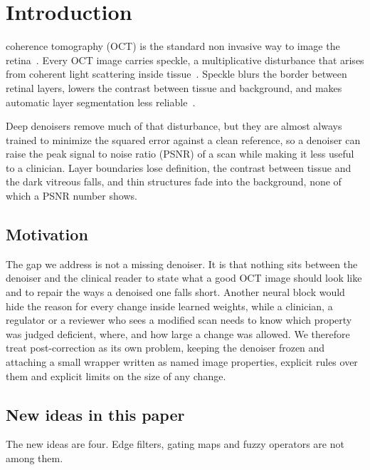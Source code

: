 \section{Introduction}
\label{sec:introduction}
 coherence tomography (OCT) is the standard non invasive way to image the
retina~\cite{huang1991optical}. Every OCT image carries speckle, a multiplicative disturbance that
arises from coherent light scattering inside tissue~\cite{goodman2007speckle}. Speckle blurs the
border between retinal layers, lowers the contrast between tissue and background, and makes
automatic layer segmentation less reliable~\cite{devalla2018drunet}.

Deep denoisers remove much of that disturbance, but they are almost always trained to minimize the
squared error against a clean reference, so a denoiser can raise the peak signal to noise ratio (PSNR)
of a scan while making it less useful to a clinician. Layer boundaries lose definition, the contrast
between tissue and the dark vitreous falls, and thin structures fade into the background, none of
which a PSNR number shows.

\subsection{Motivation}
The gap we address is not a missing denoiser. It is that nothing sits between the denoiser and the
clinical reader to state what a good OCT image should look like and to repair the ways a denoised one
falls short. Another neural block would hide the reason for every change inside learned weights,
while a clinician, a regulator or a reviewer who sees a modified scan needs to know which property
was judged deficient, where, and how large a change was allowed. We therefore treat post-correction
as its own problem, keeping the denoiser frozen and attaching a small wrapper written as named image
properties, explicit rules over them and explicit limits on the size of any change.

\subsection{New ideas in this paper}
\label{sec:contributions}
The new ideas are four. Edge filters, gating maps and fuzzy operators are not among them.

